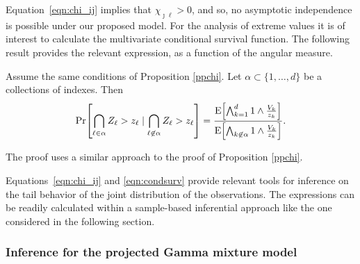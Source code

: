 Equation~\eqref{eqn:chi_ij} implies that $\chi_{\jmath\ell}>0$, and so, no asymptotic independence is possible 
  under our proposed model. For the analysis of extreme values it is of interest to calculate the multivariate 
  conditional survival function. The following result provides the relevant expression, as a function of the 
  angular measure.
  \begin{prop}
  Assume the same conditions of Proposition \ref{ppchi}.   Let $\alpha \subset \{1, \ldots ,d\}$ be a 
  collections of indexes.  Then     
  \begin{equation} \label{eqn:condsurv}
    \mathrm{Pr}\left[\bigcap_{\ell \in \alpha} 
        Z_\ell > z_\ell \mid \bigcap_{\ell\not\in\alpha} Z_\ell > z_\ell\right]
    = \frac{\expect{\bigwedge_{k = 1}^d 1\wedge \frac{V_k}{z_k}}}{\expect{\bigwedge_{k \not\in\alpha}1\wedge\frac{V_k}{z_k}}}.
  \end{equation}
  \end{prop}  
  The proof uses a similar approach to the proof of Proposition \ref{ppchi}.

Equations~\eqref{eqn:chi_ij} and \eqref{eqn:condsurv} provide relevant tools for inference on the tail 
  behavior of the joint distribution of the observations. The expressions can be readily calculated 
  within a sample-based inferential approach like the one considered in the following section.

\subsubsection{Inference for the projected Gamma mixture model}


